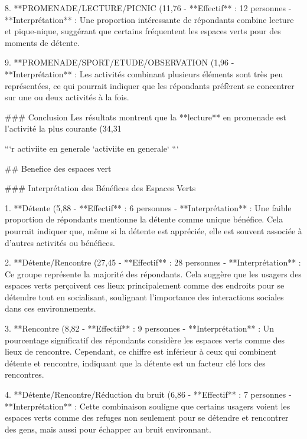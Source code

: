 8. **PROMENADE/LECTURE/PICNIC (11,76%
   - **Effectif** : 12 personnes
   - **Interprétation** : Une proportion intéressante de répondants combine lecture et pique-nique, suggérant que certains fréquentent les espaces verts pour des moments de détente.

9. **PROMENADE/SPORT/ETUDE/OBSERVATION (1,96%
   - **Interprétation** : Les activités combinant plusieurs éléments sont très peu représentées, ce qui pourrait indiquer que les répondants préfèrent se concentrer sur une ou deux activités à la fois.

### Conclusion
Les résultats montrent que la **lecture** en promenade est l'activité la plus courante (34,31%

```{r activiite en generale}
`activiite en generale`
```

## Benefice des espaces vert

### Interprétation des Bénéfices des Espaces Verts

1. **Détente (5,88%
   - **Effectif** : 6 personnes
   - **Interprétation** : Une faible proportion de répondants mentionne la détente comme unique bénéfice. Cela pourrait indiquer que, même si la détente est appréciée, elle est souvent associée à d'autres activités ou bénéfices.

2. **Détente/Rencontre (27,45%
   - **Effectif** : 28 personnes
   - **Interprétation** : Ce groupe représente la majorité des répondants. Cela suggère que les usagers des espaces verts perçoivent ces lieux principalement comme des endroits pour se détendre tout en socialisant, soulignant l'importance des interactions sociales dans ces environnements.

3. **Rencontre (8,82%
   - **Effectif** : 9 personnes
   - **Interprétation** : Un pourcentage significatif des répondants considère les espaces verts comme des lieux de rencontre. Cependant, ce chiffre est inférieur à ceux qui combinent détente et rencontre, indiquant que la détente est un facteur clé lors des rencontres.

4. **Détente/Rencontre/Réduction du bruit (6,86%
   - **Effectif** : 7 personnes
   - **Interprétation** : Cette combinaison souligne que certains usagers voient les espaces verts comme des refuges non seulement pour se détendre et rencontrer des gens, mais aussi pour échapper au bruit environnant.

